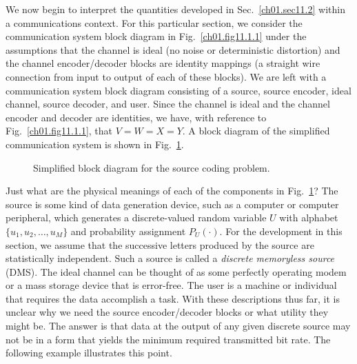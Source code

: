 We now begin to interpret the quantities developed
in Sec.~\ref{ch01.sec11.2} within a communications context.
For this particular section, we consider the communication system
block diagram in Fig.~\ref{ch01.fig11.1.1} under the assumptions that the
channel is ideal (no noise or deterministic distortion) and the channel
encoder/decoder blocks are identity mappings (a straight wire connection from
input to output of each of these blocks).
We are left with a communication system block diagram consisting of a source,
source encoder, ideal channel, source decoder, and user.
Since the channel is ideal and the channel encoder and decoder are
identities, we have, with reference to Fig.~\ref{ch01.fig11.1.1}, that
$ V = W = X = Y $. A block
diagram of the simplified communication system is shown
in Fig.~\ref{ch01.fig11.3.1}.

\begin{figure}[hbt] %
 \figboxes
\caption{Simplified block diagram for the source coding problem.
\label{ch01.fig11.3.1} }
\end{figure}

Just what are the physical meanings of each of the components in
Fig.~\ref{ch01.fig11.3.1}?
The source is some kind of data generation device, such as a computer or
computer peripheral, which generates a discrete-valued random variable $U$ with
alphabet $ \{ u_1, u_2, \dots, u_M \} $ and probability assignment
$ P_U (\cdot) $. For the development in this section, we assume that the
successive letters produced by the source are statistically independent.
Such a source is called a \textit{discrete memoryless source} (DMS).
The ideal channel can be thought of as some perfectly operating
modem or a mass storage device that is error-free. The user is a machine or
individual that requires the data accomplish a task. With these descriptions
thus far, it is unclear why we need the source encoder/decoder blocks or what
utility they might be. The answer is that data at the output of any given
discrete source may not be in a form that  yields the minimum required
transmitted
bit rate. The following example illustrates this point.


